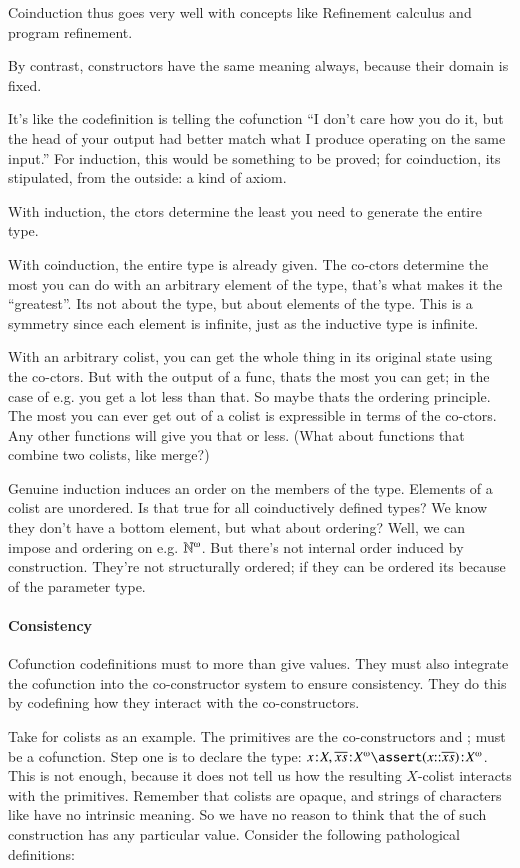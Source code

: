 \documentclass{article}
\begin{document}
Coinduction thus goes very well with concepts like Refinement calculus
and program refinement.

By contrast, constructors have the same meaning always, because their
domain is fixed.

It's like the codefinition is telling the cofunction ``I don't care
how you do it, but the head of your output had better match what I
produce operating on the same input.'' For induction, this would be
something to be proved; for coinduction, its stipulated, from the
outside: a kind of axiom.

With induction, the ctors determine the least you need to generate the
entire type.

With coinduction, the entire type is already given. The co-ctors
determine the most you can do with an arbitrary element of the type,
that's what makes it the ``greatest''. Its not about the type, but
about elements of the type. This is a symmetry since each element is
infinite, just as the inductive type is infinite.

With an arbitrary colist, you can get the whole thing in its original
state using the co-ctors. But with the output of a func, thats the
most you can get; in the case of e.g.  you get a lot less
than that. So maybe thats the ordering principle. The most you can
ever get out of a colist is expressible in terms of the co-ctors. Any
other functions will give you that or less. (What about functions that
combine two colists, like merge?)

Genuine induction induces an order on the members of the type.
Elements of a colist are unordered. Is that true for all coinductively
defined types? We know they don't have a bottom element, but what
about ordering? Well, we can impose and ordering on e.g.
\(\colist{\Nat}\). But there's not internal order induced by
construction. They're not structurally ordered; if they can be ordered
its because of the parameter type.

\paragraph{Consistency}

Cofunction codefinitions must to more than give values. They must also
integrate the cofunction into the co-constructor system to ensure
consistency. They do this by codefining how they interact with the
co-constructors.

Take \Cons{} for colists as an example. The primitives are the
co-constructors \head{} and \tail{}; \cons{} must be a cofunction.
Step one is to declare the type: \(\tj{x}{X},
\tj{\coseq{x}}{\colist{X}}\lso \tj{(x\cons\coseq{x})}{\colist{X}}\).
This is not enough, because it does not tell us how the resulting
\(X\)-colist interacts with the primitives. Remember that colists are
opaque, and strings of characters like \cons have no intrinsic
meaning. So we have no reason to think that the \head of such
construction has any particular value. Consider the following
pathological definitions:
\end{document}
